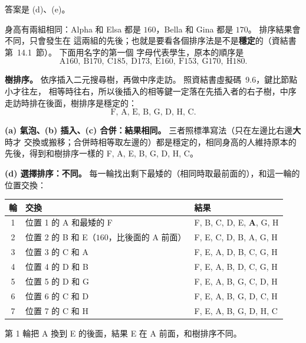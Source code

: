 \begin{pastsoln}
答案是 (d)、(e)。

身高有兩組相同：Alpha 和 Elsa 都是 $160$，Bella 和 Gina 都是 $170$。 排序結果會不同，只會發生在
這兩組的先後；也就是要看各個排序法是不是\textbf{穩定}的（資結書第~14.1~節）。 下面用名字的第一個
字母代表學生，原本的順序是
\[
\text{A}160,\ \text{B}170,\ \text{C}185,\ \text{D}173,\ \text{E}160,\ \text{F}153,\ \text{G}170,\ \text{H}180 .
\]

\textbf{樹排序。} 依序插入二元搜尋樹，再做中序走訪。 照資結書虛擬碼~9.6，鍵比節點小才往左，
相等時往右，所以後插入的相等鍵一定落在先插入者的右子樹，中序走訪時排在後面，樹排序是穩定的：
\[
\text{F, A, E, B, G, D, H, C}.
\]

\textbf{(a) 氣泡、(b) 插入、(c) 合併：結果相同。} 三者照標準寫法（只在左邊比右邊\textbf{大}時才
交換或搬移；合併時相等取左邊的）都是穩定的，相同身高的人維持原本的先後，得到和樹排序一樣的
F, A, E, B, G, D, H, C。

\textbf{(d) 選擇排序：不同。} 每一輪找出剩下最矮的（相同時取最前面的），和這一輪的位置交換：
\begin{center}
\small
\begin{tabular}{cll}
\toprule
輪 & 交換 & 結果 \\
\midrule
1 & 位置 1 的 A 和最矮的 F & F, B, C, D, E, \textbf{A}, G, H \\
2 & 位置 2 的 B 和 E（$160$，比後面的 A 前面） & F, E, C, D, B, A, G, H \\
3 & 位置 3 的 C 和 A & F, E, A, D, B, C, G, H \\
4 & 位置 4 的 D 和 B & F, E, A, B, D, C, G, H \\
5 & 位置 5 的 D 和 G & F, E, A, B, G, C, D, H \\
6 & 位置 6 的 C 和 D & F, E, A, B, G, D, C, H \\
7 & 位置 7 的 C 和 H & F, E, A, B, G, D, H, C \\
\bottomrule
\end{tabular}
\end{center}
第 1 輪把 A 換到 E 的後面，結果 E 在 A 前面，和樹排序不同。


\end{pastsoln}
